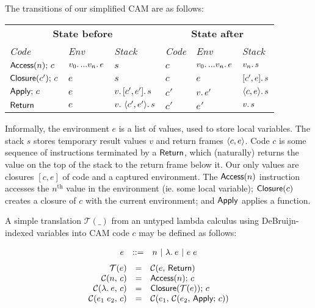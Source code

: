 \documentclass[11pt]{article}
\begin{document}
The transitions of our simplified CAM are as follows:
\begin{table}[!h]
  \centering
  \begin{tabular}{lll|lll}
    \multicolumn{3}{c|}{\bf State before} &
    \multicolumn{3}{c}{\bf State after}\\
    \it Code & \it Env & \it Stack & \it Code & \it Env & \it Stack\\\hline
    $\textsf{Access}(n);\, c$ & $v_0 .\, ... v_n .\, e$ & $s$ &
    $c$ & $v_0 .\, ... v_n .\, e$ & $v_n .\, s$\\
    $\textsf{Closure}(c');\, c$ & $e$ & $s$ &
    $c$ & $e$ & $[c',e] .\, s$\\
    $\textsf{Apply};\, c$ & $e$ & $v .\, [c',e'] .\, s$ &
    $c'$ & $v .\, e'$ & $\left\langle c, e\right\rangle\! .\, s$\\
    $\textsf{Return}$ & $e$ & $v .\, \left\langle c',e'\right\rangle\! .\, s$ &
    $c'$ & $e'$ & $v .\, s$
  \end{tabular}
\end{table}

\newcommand{\camt}[1]{\ensuremath{\mathcal{T}(#1)}}
\newcommand{\camc}[2]{\ensuremath{\mathcal{C}({#1},\, {#2})}}

Informally, the environment $e$ is a list of values, used to store local
variables. The stack $s$ stores temporary result values $v$ and return frames
$\left\langle c,e\right\rangle$. Code $c$ is some sequence of instructions terminated by a $\textsf{Return}$,
which (naturally) returns the value on the top of the stack to the return frame
below it. Our only values are closures $[c,e]$ of code and a captured
environment. The $\textsf{Access}(n)$ instruction accesses the $n^{\text{th}}$ value in
the environment (ie. some local variable); $\textsf{Closure}(c)$ creates a closure of
$c$ with the current environment; and $\textsf{Apply}$ applies a function.

\newpage
A simple translation $\camt{\_}$ from an untyped lambda calculus using
DeBruijn-indexed variables into CAM code $c$ may be defined as follows:

\[\begin{array}{rcl}
  e &::=& n ~|~ \lambda .\: e ~|~ e \; e
\end{array}\]\[
\begin{array}{rcl}
  \camt{e} &=& \camc{e}{\Return}\\
  \camc{n}{c} &=& \Access{n}\semi c\\
  \camc{\ulam{}{e}}{c} &=& \Closure{\camt{e}}\semi c\\
  \camc{e_1 \ap e_2}{c} &=& \camc{e_1}{\camc{e_2}{\Apply\semi c}}
\end{array}\]
\end{document}
